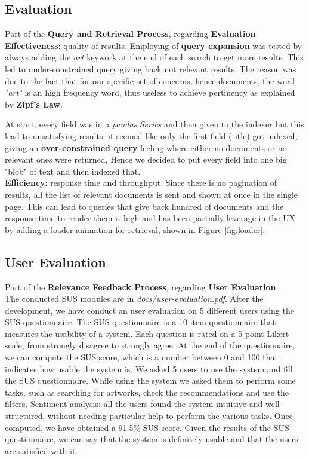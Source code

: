 \documentclass[12pt]{spieman}  %
\begin{document}
\begin{spacing}{1}
    \section{Evaluation}\label{sec:evaluation}
    Part of the \textbf{Query and Retrieval Process}, regarding \textbf{Evaluation}.\\
    \textbf{Effectiveness}: quality of results.
    Employing of \textbf{query expansion} was tested by always adding the \textit{art} keywork
    at the end of each search to get more results.
    This led to under-constrained query giving back not relevant results.
    The reason was due to the fact that for our specific set of concerns, hence documents, the word
    \textit{"art"} is an high frequency word, thus useless to achieve pertinency as explained by
    \textbf{Zipf's Law}.

    At start, every field was in a \textit{pandas.Series} and then given to the indexer but this lead to
    unsatisfying results: it seemed like only the first field (title) got indexed,
    giving an \textbf{over-constrained query} feeling where either no documents or no relevant ones were returned,
    Hence we decided to put every field into one big "blob" of text and then indexed that.\\
    \textbf{Efficiency}: response time and throughput.
    Since there is no pagination of results, all the list of relevant documents is sent and shown at once
    in the single page.
    This can lead to queries that give back hundred of documents and the response time to render them is high
    and has been partially leverage in the UX by adding a loader animation for retrieval,
    shown in Figure \ref{fig:loader}.

    \subsection{User Evaluation}
    Part of the \textbf{Relevance Feedback Process}, regarding \textbf{User Evaluation}.\\
    The conducted SUS modules are in \textit{docs/user-evaluation.pdf}.
    After the development, we have conduct an user evaluation on 5 different users using the SUS questionnaire.
    The SUS questionnaire is a 10-item questionnaire that measures the usability of a system.
    Each question is rated on a 5-point Likert scale, from strongly disagree to strongly agree.
    At the end of the questionnaire, we can compute the SUS score, which is a number between 0 and 100
    that indicates how usable the system is.
    We asked 5 users to use the system and fill the SUS questionnaire.
    While using the system we asked them to perform some tasks, such as searching for artworks,
    check the recommendations and use the filters.
    Sentiment analysis: all the users found the system intuitive and well-structured,
    without needing particular help to perform the various tasks.
    Once computed, we have obtained a 91.5\% SUS score.
    Given the results of the SUS questionnaire, we can say that the system is definitely usable
    and that the users are satisfied with it.


\end{spacing}
\end{document}
